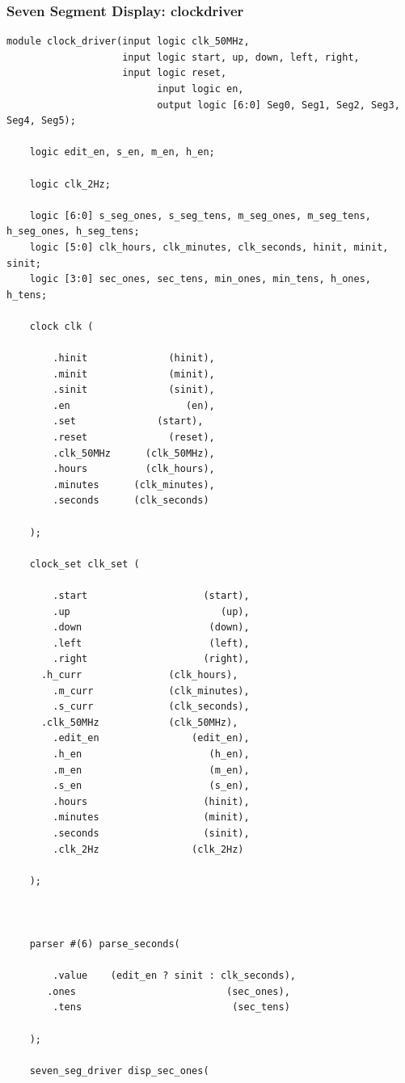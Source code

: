 \documentclass[a4paper]{article}
\begin{document}
\subsubsection{Seven Segment Display: clockdriver}
\begin{Verbatim}
module clock_driver(input logic clk_50MHz,
                    input logic start, up, down, left, right,
                    input logic reset,
						  input logic en,
						  output logic [6:0] Seg0, Seg1, Seg2, Seg3, Seg4, Seg5);
						
	logic edit_en, s_en, m_en, h_en;
	
	logic clk_2Hz;
	
	logic [6:0] s_seg_ones, s_seg_tens, m_seg_ones, m_seg_tens, h_seg_ones, h_seg_tens;
	logic [5:0] clk_hours, clk_minutes, clk_seconds, hinit, minit, sinit;
	logic [3:0] sec_ones, sec_tens, min_ones, min_tens, h_ones, h_tens;
	
	clock clk (
	   
		.hinit              (hinit),
		.minit              (minit),
		.sinit              (sinit),
		.en                    (en),
		.set              (start),
		.reset              (reset),
		.clk_50MHz      (clk_50MHz),
		.hours          (clk_hours),
		.minutes      (clk_minutes),
		.seconds      (clk_seconds)
	
	);
	
	clock_set clk_set (
	   
		.start                    (start),	
		.up                          (up),        
		.down                      (down),
		.left                      (left), 
		.right                    (right),
      .h_curr               (clk_hours), 
		.m_curr             (clk_minutes), 
		.s_curr             (clk_seconds),       
      .clk_50MHz            (clk_50MHz),
		.edit_en                (edit_en), 
		.h_en                      (h_en), 
		.m_en                      (m_en), 
		.s_en                      (s_en),
		.hours                    (hinit), 
		.minutes                  (minit), 
		.seconds                  (sinit),
		.clk_2Hz                (clk_2Hz)
	
	);
	
	
	
	parser #(6) parse_seconds(
	   
		.value    (edit_en ? sinit : clk_seconds),
	   .ones                          (sec_ones),
		.tens                          (sec_tens)  
	
	);
	
	seven_seg_driver disp_sec_ones(
	

\end{Verbatim}
\end{document}
